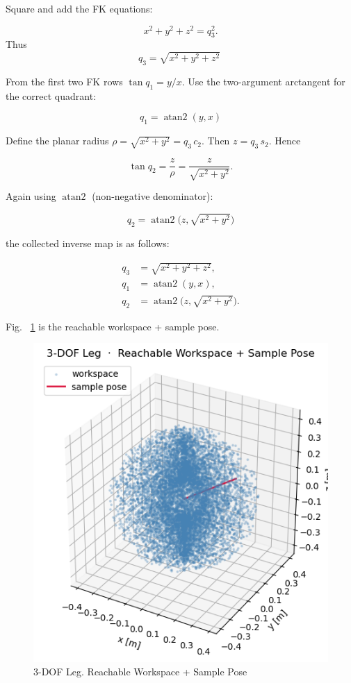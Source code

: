 \documentclass[12pt,a4paper]{article}
\begin{document}
Square and add the FK equations:

\[
x^{2}+y^{2}+z^{2}=q_{3}^{2}.
\]
Thus
\[
q_{3}=\sqrt{x^{2}+y^{2}+z^{2}}\;
\]

From the first two FK rows
\(\tan q_{1}=y/x\).
Use the two-argument arctangent for the correct quadrant:

\[
q_{1}=\operatorname{atan2}(y,x)
\]

Define the planar radius \(\rho=\sqrt{x^{2}+y^{2}}=q_{3}\,c_{2}\).
Then \(z=q_{3}\,s_{2}\).  Hence

\[
\tan q_{2}=\frac{z}{\rho}
          =\frac{z}{\sqrt{x^{2}+y^{2}}}.
\]

Again using \(\operatorname{atan2}\) (non-negative denominator):

\[
q_{2}=\operatorname{atan2}\!\bigl(z,\sqrt{x^{2}+y^{2}}\bigr)
\]

the collected inverse map is as follows:

\[
\boxed{
\begin{aligned}
q_{3} &= \sqrt{x^{2}+y^{2}+z^{2}},\\[4pt]
q_{1} &= \operatorname{atan2}(y,x),\\[4pt]
q_{2} &= \operatorname{atan2}\!\bigl(z,\sqrt{x^{2}+y^{2}}\bigr).
\end{aligned}}
\]

Fig. ~\ref{fig:robotic leg} is the reachable workspace + sample pose.
\begin{figure}[htbp]
  \centering
  \includegraphics[width=0.9\linewidth]{../figs/exercise_4.png}
  \caption{3-DOF Leg. Reachable Workspace + Sample Pose}
  \label{fig:robotic leg}
\end{figure}
\end{document}
